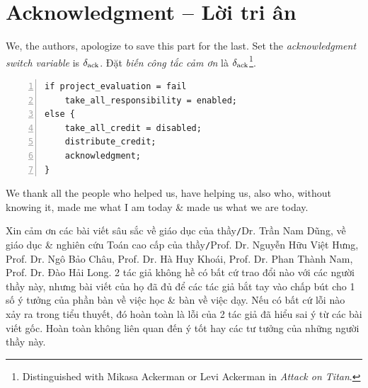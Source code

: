 \documentclass[12pt,oneside]{book}
\begin{document}

\appendix


\chapter{Acknowledgment -- Lời tri ân}
\minitoc
We, the authors, apologize to save this part for the last. Set the {\it acknowledgment switch variable} is $\delta_{\rm ack}$. Đặt {\it biến công tắc cảm ơn} là $\delta_{\rm ack}$\footnote{Distinguished with {\sc Mikasa Ackerman} or {\sc Levi Ackerman} in {\it Attack on Titan}.}.

\begin{Verbatim}[numbers=left,xleftmargin=5mm]
if project_evaluation = fail
    take_all_responsibility = enabled;
else {
    take_all_credit = disabled;
    distribute_credit;
    acknowledgment;
}
\end{Verbatim}
We thank all the people who helped us, have helping us, also who, without knowing it, made me what I am today \& made us what we are today.

Xin cảm ơn các bài viết sâu sắc về giáo dục của thầy{\tt/}Dr. {\sc Trần Nam Dũng}, về giáo dục \& nghiên cứu Toán cao cấp của thầy{\tt/}Prof. Dr. {\sc Nguyễn Hữu Việt Hưng}, Prof. Dr. {\sc Ngô Bảo Châu}, Prof. Dr. {\sc Hà Huy Khoái}, Prof. Dr. {\sc Phan Thành Nam}, Prof. Dr. {\sc Đào Hải Long}. 2 tác giả không hề có bất cứ trao đổi nào với các người thầy này, nhưng bài viết của họ đã đủ để các tác giả bắt tay vào chấp bút cho 1 số ý tưởng của phần bàn về việc học \& bàn về việc dạy. Nếu có bất cứ lỗi nào xảy ra trong tiểu thuyết, đó hoàn toàn là lỗi của 2 tác giả đã hiểu sai ý từ các bài viết gốc. Hoàn toàn không liên quan đến ý tốt hay các tư tưởng của những người thầy này.
\end{document}
